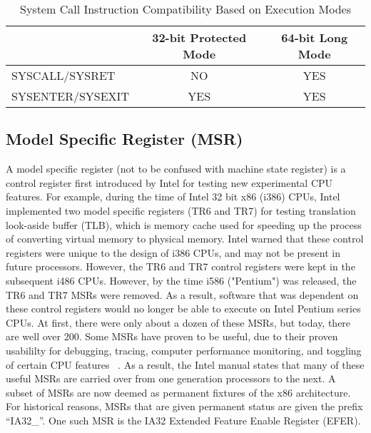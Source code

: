 \documentclass{report}
\begin{document}
\begin{spacing}{1.5}
\begin{table}[ht]
\centering
\caption{System Call Instruction Compatibility Based on Execution Modes}
\begin{tabular}[t]{lcc}
\hline
&32-bit Protected Mode&64-bit Long Mode\\
\hline
SYSCALL/SYSRET &NO&YES\\
SYSENTER/SYSEXIT&YES&YES\\
\hline
\end{tabular}
\end{table}%



\subsection{Model Specific Register (MSR)}

{\large
A model specific register (not to be confused with machine state register) is a control register first introduced by Intel for testing new experimental CPU features. For example, during the time of Intel 32 bit x86 (i386) CPUs, Intel implemented two model specific registers (TR6 and TR7) for testing translation look-aside buffer (TLB), which is memory cache used for speeding up the process of converting virtual memory to physical memory. Intel warned that these control registers were unique to the design of i386 CPUs, and may not be present in future processors. However, the TR6 and TR7 control registers were kept in the subsequent i486 CPUs. However, by the time i586 ("Pentium") was released, the TR6 and TR7 MSRs were removed. As a result, software that was dependent on these control registers would no longer be able to execute on Intel Pentium series CPUs. At first, there were only about a dozen of these MSRs, but today, there are well over 200. Some MSRs have proven to be useful, due to their proven usabililty for debugging, tracing, computer performance monitoring, and toggling of certain CPU features ~\cite{intelMSRManual}. As a result, the Intel manual states that many of these useful MSRs are carried over from one generation processors to the next. A subset of MSRs are now deemed as permanent fixtures of the x86 architecture. For historical reasons, MSRs that are given permanent status are given the prefix “IA32\_”. One such MSR is the IA32 Extended Feature Enable Register (EFER).
\newline
}


\end{spacing}
\end{document}
